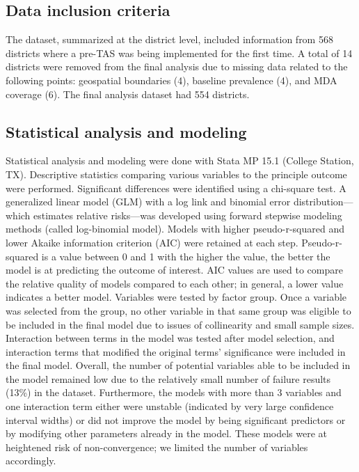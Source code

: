 \documentclass[11pt,a4paper]{article}
\begin{document}
\subsection{Data inclusion criteria}

The dataset, summarized at the district level, included information from 568 districts where a pre-TAS was being implemented for the first time. A total of 14 districts were removed from the final analysis due to missing data related to the following points: geospatial boundaries (4), baseline prevalence (4), and MDA coverage (6). The final analysis dataset had 554 districts.

\subsection{Statistical analysis and modeling}

Statistical analysis and modeling were done with Stata MP 15.1 (College Station, TX). Descriptive statistics comparing various variables to the principle outcome were performed. Significant differences were identified using a chi-square test. A generalized linear model (GLM) with a log link and binomial error distribution—which estimates relative risks—was developed using forward stepwise modeling methods (called log-binomial model). Models with higher pseudo-r-squared and lower Akaike information criterion (AIC) were retained at each step. Pseudo-r-squared is a value between 0 and 1 with the higher the value, the better the model is at predicting the outcome of interest. AIC values are used to compare the relative quality of models compared to each other; in general, a lower value indicates a better model. Variables were tested by factor group. Once a variable was selected from the group, no other variable in that same group was eligible to be included in the final model due to issues of collinearity and small sample sizes. Interaction between terms in the model was tested after model selection, and interaction terms that modified the original terms’ significance were included in the final model. Overall, the number of potential variables able to be included in the model remained low due to the relatively small number of failure results (13\%) in the dataset. Furthermore, the models with more than 3 variables and one interaction term either were unstable (indicated by very large confidence interval widths) or did not improve the model by being significant predictors or by modifying other parameters already in the model. These models were at heightened risk of non-convergence; we limited the number of variables accordingly.
\end{document}
